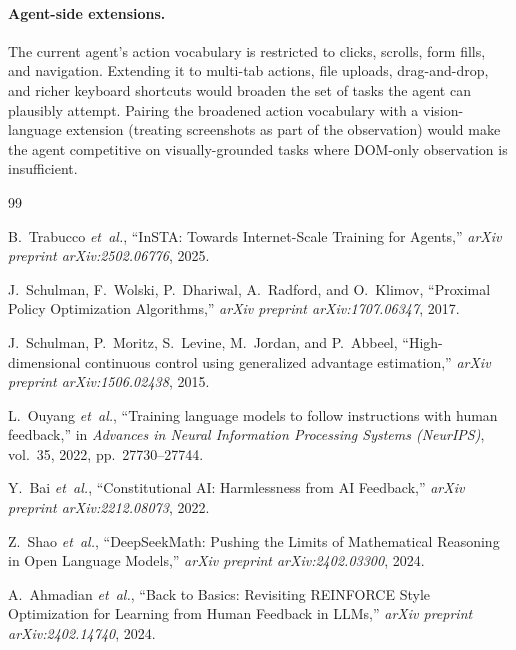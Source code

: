 \documentclass[12pt,a4paper]{report}
\begin{document}
\paragraph{Agent-side extensions.} The current agent's action vocabulary is restricted to clicks, scrolls, form fills, and navigation. Extending it to multi-tab actions, file uploads, drag-and-drop, and richer keyboard shortcuts would broaden the set of tasks the agent can plausibly attempt. Pairing the broadened action vocabulary with a vision-language extension (treating screenshots as part of the observation) would make the agent competitive on visually-grounded tasks where DOM-only observation is insufficient.

\begin{thebibliography}{99}

B.~Trabucco \textit{et~al.}, ``InSTA: Towards Internet-Scale Training for Agents,'' \textit{arXiv preprint arXiv:2502.06776}, 2025.

J.~Schulman, F.~Wolski, P.~Dhariwal, A.~Radford, and O.~Klimov, ``Proximal Policy Optimization Algorithms,'' \textit{arXiv preprint arXiv:1707.06347}, 2017.

J.~Schulman, P.~Moritz, S.~Levine, M.~Jordan, and P.~Abbeel, ``High-dimensional continuous control using generalized advantage estimation,'' \textit{arXiv preprint arXiv:1506.02438}, 2015.

L.~Ouyang \textit{et~al.}, ``Training language models to follow instructions with human feedback,'' in \textit{Advances in Neural Information Processing Systems (NeurIPS)}, vol.~35, 2022, pp.~27730--27744.

Y.~Bai \textit{et~al.}, ``Constitutional AI: Harmlessness from AI Feedback,'' \textit{arXiv preprint arXiv:2212.08073}, 2022.

Z.~Shao \textit{et~al.}, ``DeepSeekMath: Pushing the Limits of Mathematical Reasoning in Open Language Models,'' \textit{arXiv preprint arXiv:2402.03300}, 2024.

A.~Ahmadian \textit{et~al.}, ``Back to Basics: Revisiting REINFORCE Style Optimization for Learning from Human Feedback in LLMs,'' \textit{arXiv preprint arXiv:2402.14740}, 2024.


\end{thebibliography}
\end{document}
